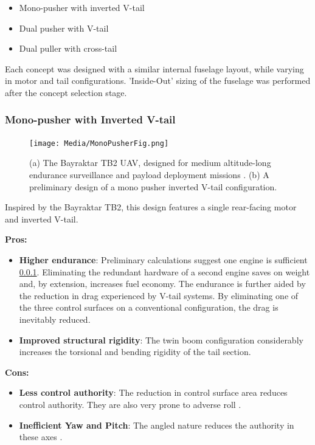 \documentclass[12pt]{article}
\begin{document}
	\begin{itemize}
		\item Mono-pusher with inverted V-tail
		\item Dual pusher with V-tail
		\item Dual puller with cross-tail
	\end{itemize}
	
	Each concept was designed with a similar internal fuselage layout, while varying in motor and tail configurations. 'Inside-Out' sizing of the fuselage was performed after the concept selection stage.
	
	\newpage
	
	\subsubsection{Mono-pusher with Inverted V-tail}
	\begin{figure}[h!]
		\centering
		\texttt{[image: Media/MonoPusherFig.png]} %
		\caption{(a) The Bayraktar TB2 UAV, designed for medium altitude-long endurance surveillance and payload deployment missions \cite{}. (b) A preliminary design of a mono pusher inverted V-tail configuration.}
	\end{figure}
	Inspired by the Bayraktar TB2, this design features a single rear-facing motor and inverted V-tail.
	
	\textbf{Pros:}
	\begin{itemize}
		\item \textbf{Higher endurance}: Preliminary calculations suggest one engine is sufficient \ref{}. Eliminating the redundant hardware of a second engine saves on weight and, by extension, increases fuel economy. The endurance is further aided by the reduction in drag experienced by V-tail systems. By eliminating one of the three control surfaces on a conventional configuration, the drag is inevitably reduced. 
		\item \textbf{Improved structural rigidity}: The twin boom configuration considerably increases the torsional and bending rigidity of the tail section.
	\end{itemize}
	
	\textbf{Cons:}
	\begin{itemize}
		\item \textbf{Less control authority}: The reduction in control surface area reduces control authority. They are also very prone to adverse roll \cite{}.
		\item \textbf{Inefficient Yaw and Pitch}: The angled nature reduces the authority in these axes \cite{}.
	\end{itemize}
	
\end{document}
